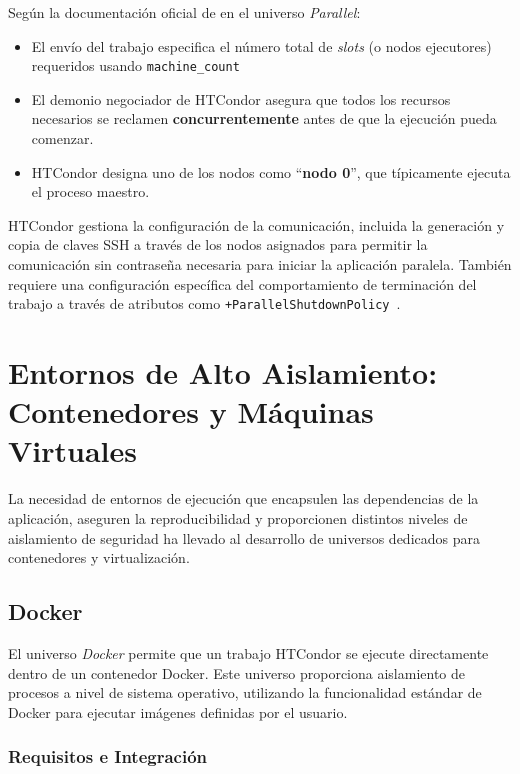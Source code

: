 Según la documentación oficial de \citep{HTCondor-env-services} en el universo \textit{Parallel}:

\begin{itemize}
	\item El envío del trabajo especifica el número total de \textit{slots} (o nodos ejecutores) requeridos usando \texttt{machine\_count}
	\item El demonio negociador de HTCondor asegura que todos los recursos necesarios se reclamen \textbf{concurrentemente} antes de que la ejecución pueda comenzar.
	\item HTCondor designa uno de los nodos como ``\textbf{nodo 0}'', que típicamente ejecuta el proceso maestro.
\end{itemize}

HTCondor gestiona la configuración de la comunicación, incluida la generación y copia de claves SSH a través de los nodos asignados para permitir la comunicación sin contraseña necesaria para iniciar la aplicación paralela. También requiere una configuración específica del comportamiento de terminación del trabajo a través de atributos como \texttt{+ParallelShutdownPolicy}~\citep{HTCondor-env-services}.




\section{Entornos de Alto Aislamiento: Contenedores y Máquinas Virtuales}

La necesidad de entornos de ejecución que encapsulen las dependencias de la aplicación, aseguren la reproducibilidad y proporcionen distintos niveles de aislamiento de seguridad ha llevado al desarrollo de universos dedicados para contenedores y virtualización.

\subsection{Docker}

El universo \textit{Docker} permite que un trabajo HTCondor se ejecute directamente dentro de un contenedor Docker. Este universo proporciona aislamiento de procesos a nivel de sistema operativo, utilizando la funcionalidad estándar de Docker para ejecutar imágenes definidas por el usuario.

\subsubsection{Requisitos e Integración}

